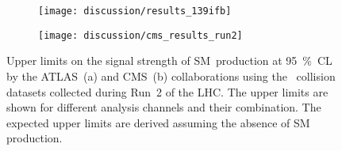 \begin{figure}[tbp]
  \centering

  \begin{subfigure}[b]{\textwidth}
    \centering

    \hspace{0.98em}\texttt{[image: discussion/results\_139ifb]}

    \label{fig:atlas_run2_139ifb}
  \end{subfigure}

  \vspace{12pt}

  \begin{subfigure}[b]{\textwidth}
    \centering

    \texttt{[image: discussion/cms\_results\_run2]}

    \label{fig:cms_run2_138ifb}
  \end{subfigure}

  \caption{Upper limits on the signal strength of SM~\HH production at
    \SI{95}{\percent}~CL by the ATLAS~(a) and CMS~(b) collaborations using the
    \pp~collision datasets collected during Run~2 of the LHC. The upper limits
    are shown for different analysis channels and their combination. The
    expected upper limits are derived assuming the absence of SM~\HH
    production.}%
  \label{fig:run2_hh_results}
\end{figure}

